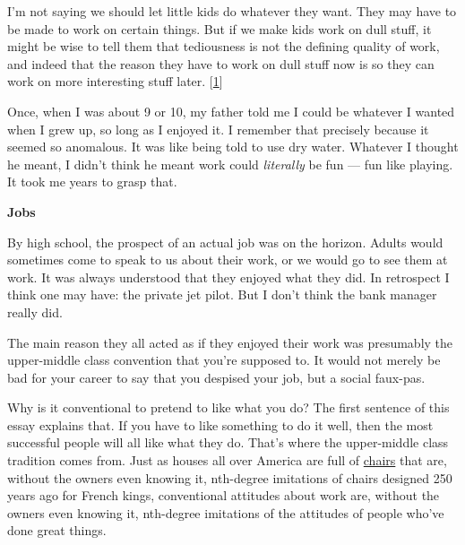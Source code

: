 I'm not saying
                    we should let little kids do whatever they want. They may
                    have to be made to work on certain things. But if we make
                    kids work on dull stuff, it might be wise to tell them that
                    tediousness is not the defining quality of work, and indeed
                    that the reason they have to work on dull stuff now is so
                    they can work on more interesting stuff later.
                    [\href{\#f1n}{1}]

Once, when I was about 9 or 10, my father told
                    me I could be whatever I wanted when I grew up, so long as I
                    enjoyed it. I remember that precisely because it seemed so
                    anomalous. It was like being told to use dry water. Whatever
                    I thought he meant, I didn't think he meant work could
                    \emph{literally} be fun --- fun like playing. It took me
                    years to grasp that.

\textbf{Jobs}

By
                    high school, the prospect of an actual job was on the
                    horizon. Adults would sometimes come to speak to us about
                    their work, or we would go to see them at work. It was
                    always understood that they enjoyed what they did. In
                    retrospect I think one may have: the private jet pilot. But
                    I don't think the bank manager really did.

The
                    main reason they all acted as if they enjoyed their work was
                    presumably the upper-middle class convention that you're
                    supposed to. It would not merely be bad for your career to
                    say that you despised your job, but a social faux-pas.

Why
                    is it conventional to pretend to like what you do? The first
                    sentence of this essay explains that. If you have to like
                    something to do it well, then the most successful people
                    will all like what they do. That's where the upper-middle
                    class tradition comes from. Just as houses all over America
                    are full of
                    \href{http://images.google.com/images?q=louis\%20xv\%20chair}{chairs}
                    that are, without the owners even knowing it, nth-degree
                    imitations of chairs designed 250 years ago for French
                    kings, conventional attitudes about work are, without the
                    owners even knowing it, nth-degree imitations of the
                    attitudes of people who've done great things.

